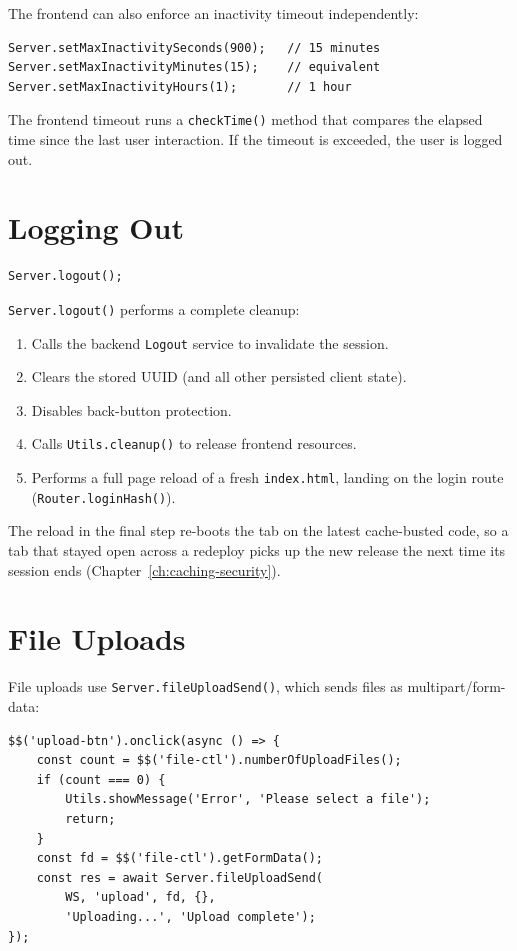 The frontend can also enforce an inactivity timeout independently:

\begin{lstlisting}[style=javascript]
Server.setMaxInactivitySeconds(900);   // 15 minutes
Server.setMaxInactivityMinutes(15);    // equivalent
Server.setMaxInactivityHours(1);       // 1 hour
\end{lstlisting}

\noindent
The frontend timeout runs a \texttt{checkTime()} method that compares the elapsed time since the last user interaction.  If the timeout is exceeded, the user is logged out.

\section{Logging Out}
\label{sec:sc-logout}

\begin{lstlisting}[style=javascript]
Server.logout();
\end{lstlisting}

\noindent
\texttt{Server.logout()} performs a complete cleanup:

\begin{enumerate}
  \item Calls the backend \texttt{Logout} service to invalidate the session.
  \item Clears the stored UUID (and all other persisted client state).
  \item Disables back-button protection.
  \item Calls \texttt{Utils.cleanup()} to release frontend resources.
  \item Performs a full page reload of a fresh \texttt{index.html}, landing on the login route (\texttt{Router.loginHash()}).
\end{enumerate}

\noindent
The reload in the final step re-boots the tab on the latest cache-busted code, so a tab that stayed open across a redeploy picks up the new release the next time its session ends (Chapter~\ref{ch:caching-security}).

\section{File Uploads}
\label{sec:sc-uploads}

File uploads use \texttt{Server.fileUploadSend()}, which sends files as multipart/form-data:

\begin{lstlisting}[style=javascript]
$$('upload-btn').onclick(async () => {
    const count = $$('file-ctl').numberOfUploadFiles();
    if (count === 0) {
        Utils.showMessage('Error', 'Please select a file');
        return;
    }
    const fd = $$('file-ctl').getFormData();
    const res = await Server.fileUploadSend(
        WS, 'upload', fd, {},
        'Uploading...', 'Upload complete');
});
\end{lstlisting}

